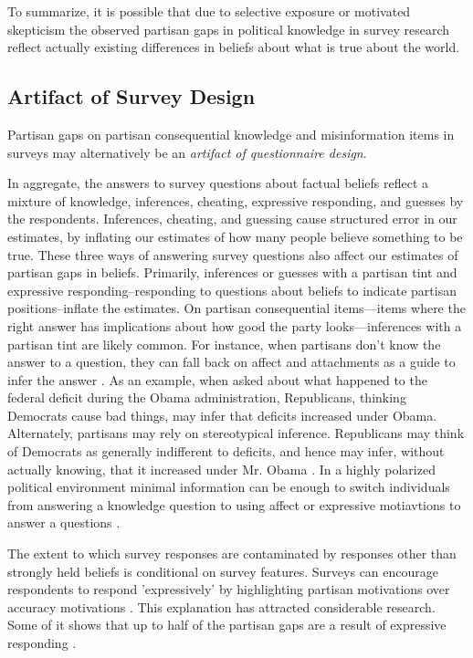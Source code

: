 \documentclass[12pt, letterpaper]{article}
\begin{document}
To summarize, it is possible that due to selective exposure or motivated skepticism the observed partisan gaps in political knowledge in survey research reflect actually existing differences in beliefs about what is true about the world.

\subsection*{Artifact of Survey Design}
Partisan gaps on partisan consequential knowledge and misinformation items in surveys may alternatively be an \emph{artifact of questionnaire design}.

In aggregate, the answers to survey questions about factual beliefs reflect a mixture of knowledge, inferences, cheating, expressive responding, and guesses by the respondents. Inferences, cheating, and guessing cause structured error in our estimates, by inflating our estimates of how many people believe something to be true. These three ways of answering survey questions also affect our estimates of partisan gaps in beliefs.
Primarily, inferences or guesses with a partisan tint and expressive responding--responding to questions about beliefs to indicate partisan positions--inflate the estimates. On partisan consequential items---items where the right answer has implications about how good the party looks---inferences with a partisan tint are likely common. For instance, when partisans don't know the answer to a question, they can fall back on affect and attachments as a guide to infer the answer \citep{malka2022expressive}. As an example, when asked about what happened to the federal deficit during the Obama administration, Republicans, thinking Democrats cause bad things, may infer that deficits increased under Obama. Alternately, partisans may rely on stereotypical inference. Republicans may think of Democrats as generally indifferent to deficits, and hence may infer, without actually knowing, that it increased under Mr. Obama \citep[e.g.][]{rahn1993role, goggin2020goes}. In a highly polarized political environment minimal information can be enough to switch individuals from answering a knowledge question to using affect or expressive motiavtions to answer a questions \citep{klar2014partisanship, merkley2018party}.

The extent to which survey responses are contaminated by responses other than strongly held beliefs is conditional on survey features. Surveys can encourage respondents to respond 'expressively' by highlighting partisan motivations over accuracy motivations \citep{Zaller1992, petersen2013motivated, klar2014partisanship}. This explanation has attracted considerable research. Some of it shows that up to half of the partisan gaps are a result of expressive responding \citep[][though see \citeauthor{berinsky_2017} \citeyear{berinsky_2017}]{bullocketal_2015,huber_yair_2018, prior2015you}.
\end{document}

